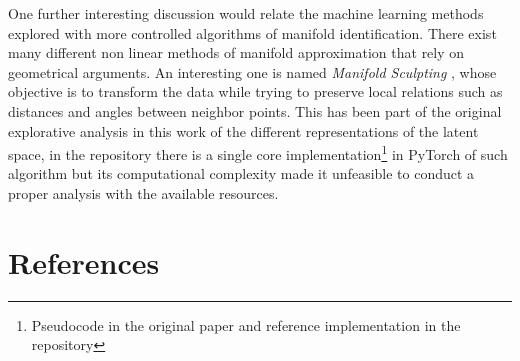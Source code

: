 \documentclass[twocolumn,gsifonts,twoside]{gsipaper}
\begin{document}
One further interesting discussion would relate the machine learning methods explored with more controlled algorithms of manifold identification. There exist many different non linear methods of manifold approximation that rely on geometrical arguments. An interesting one is named \emph{Manifold Sculpting} %
, whose objective is to transform the data while trying to preserve local relations such as distances and angles between neighbor points. This has been part of the original explorative analysis in this work of the different representations of the latent space, in the repository %
there is a single core implementation\footnote{Pseudocode in the original paper %
and reference implementation in the repository %
} in PyTorch of such algorithm but its computational complexity made it unfeasible to conduct a proper analysis with the available resources. 



\section{References}
\end{document}
